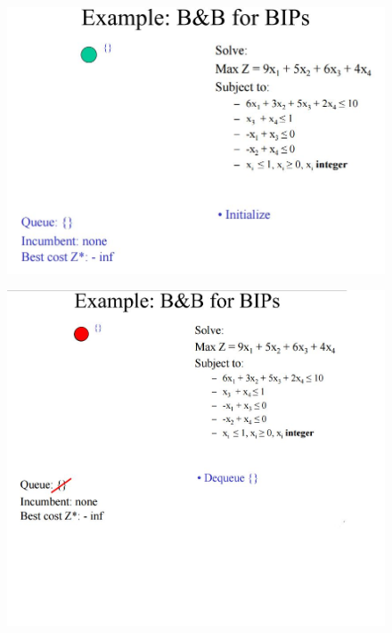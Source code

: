 \documentclass{beamer}
\begin{document}
\begin{frame}
\begin{figure}
\centering
\includegraphics[width=1.1\linewidth]{BB-BIP/BB-BIP1}
\end{figure}
\end{frame}
\begin{frame}
	\begin{figure}
		\centering
		\includegraphics[width=1.1\linewidth]{BB-BIP/BB-BIP2}
	\end{figure}
\end{frame}
\end{document}
